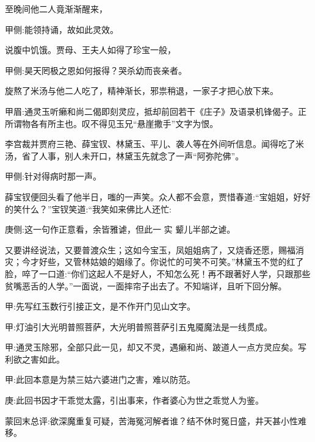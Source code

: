 \begin{parag}
    至晚间他二人竟渐渐醒来，\begin{note}甲侧:能领持诵，故如此灵效。\end{note}说腹中饥饿。贾母、王夫人如得了珍宝一般，\begin{note}甲侧:昊天罔极之恩如何报得？哭杀幼而丧亲者。\end{note}旋熬了米汤与他二人吃了，精神渐长，邪祟稍退，一家子才把心放下来。\begin{note}甲眉:通灵玉听癞和尚二偈即刻灵应，抵却前回若干《庄子》及语录机锋偈子。正所谓物各有所主也。叹不得见玉兄“悬崖撒手”文字为恨。\end{note}李宫裁并贾府三艳、薛宝钗、林黛玉、平儿、袭人等在外间听信息。闻得吃了米汤，省了人事，别人未开口，林黛玉先就念了一声“阿弥陀佛”。\begin{note}甲侧:针对得病时那一声。\end{note}薛宝钗便回头看了他半日，嗤的一声笑。众人都不会意，贾惜春道:“宝姐姐，好好的笑什么？”宝钗笑道:“我笑如来佛比人还忙:\begin{note}庚侧:这一句作正意看，余皆雅谑，但此一 实 颦儿半部之谑。\end{note}又要讲经说法，又要普渡众生；这如今宝玉，凤姐姐病了，又烧香还愿，赐福消灾；今才好些，又管林姑娘的姻缘了。你说忙的可笑不可笑。”林黛玉不觉的红了脸，啐了一口道:“你们这起人不是好人，不知怎么死！再不跟著好人学，只跟那些贫嘴恶舌的人学。”一面说，一面摔帘子出去了。不知端详，且听下回分解。
\end{parag}


\begin{parag}
    \begin{note}甲:先写红玉数行引接正文，是不作开门见山文字。\end{note}
\end{parag}


\begin{parag}
    \begin{note}甲:灯油引大光明普照菩萨，大光明普照菩萨引五鬼魇魔法是一线贯成。\end{note}
\end{parag}


\begin{parag}
    \begin{note}甲:通灵玉除邪，全部只此一见，却又不灵，遇癞和尚、跛道人一点方灵应矣。写利欲之害如此。\end{note}
\end{parag}


\begin{parag}
    \begin{note}甲:此回本意是为禁三姑六婆进门之害，难以防范。\end{note}
\end{parag}


\begin{parag}
    \begin{note}庚:此回书因才干乖觉太露，引出事来，作者婆心为世之乖觉人为鉴。\end{note}
\end{parag}


\begin{parag}
    \begin{note}蒙回末总评:欲深魔重复可疑，苦海冤河解者谁？结不休时冤日盛，井天甚小性难移。\end{note}
\end{parag}

